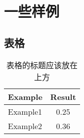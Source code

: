 
\section{一些样例}

\subsection{表格}

\begin{table}[htb]
    \begin{center}
        \caption{表格的标题应该放在上方}\label{table}
        \begin{tabular}{lc} %
            \toprule
            Example & Result \\
            \midrule
            Example1          & 0.25 \\
            Example2          & 0.36 \\
            \bottomrule
        \end{tabular}
    \end{center}
\end{table}